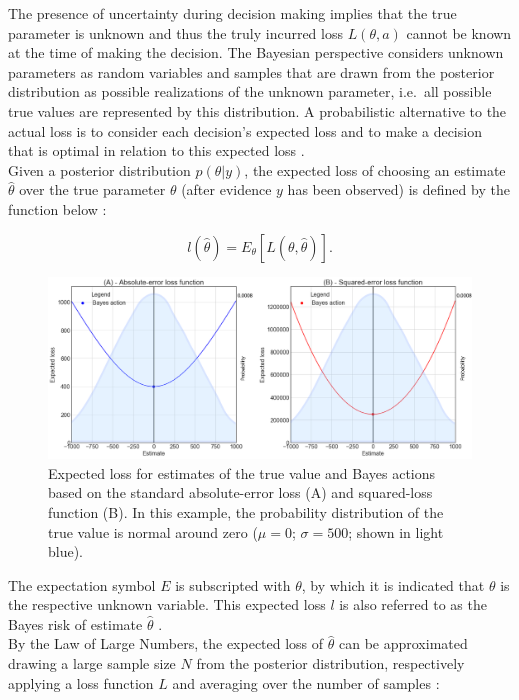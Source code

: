         The presence of uncertainty during decision making implies that the true parameter is unknown and thus the truly incurred loss $L(\theta,a)$ cannot be known at the time of making the decision. The Bayesian perspective considers unknown parameters as random variables and samples that are drawn from the posterior distribution as possible realizations of the unknown parameter, i.e.\ all possible true values are represented by this distribution. A probabilistic alternative to the actual loss is to consider each decision's expected loss and to make a decision that is optimal in relation to this expected loss \citep{berger2013stat, davidson2015}.\\        
        Given a posterior distribution $p(\theta|y)$, the expected loss of choosing an estimate $\hat{\theta}$ over the true parameter $\theta$ (after evidence $y$ has been observed) is defined by the function below \citep{davidson2015}:
        
        \begin{equation}\label{eq:ExpectedLoss}
        l(\hat{\theta}) = E_{\theta}[L(\theta,\hat{\theta})].
        \end{equation}  
        
        \begin{figure}[h]
        	\centering
        	\includegraphics[width=1\textwidth]{Figures/loss_functions2.png}
        	\caption{Expected loss for estimates of the true value and Bayes actions based on the standard absolute-error loss (A) and squared-loss function (B). In this example, the probability distribution of the true value is normal around zero ($\mu = 0$; $\sigma = 500$; shown in light blue).}\label{fig:standard_LF} 
        \end{figure}
        
        The expectation symbol $E$ is subscripted with $\theta$, by which it is indicated that $\theta$ is the respective unknown variable. This expected loss $l$ is also referred to as the Bayes risk of estimate $\hat{\theta}$ \citep{berger2013stat, davidson2015}.\\        
        By the Law of Large Numbers, the expected loss of $\hat{\theta}$ can be approximated drawing a large sample size $N$ from the posterior distribution, respectively applying a loss function $L$ and averaging over the number of samples \citep{davidson2015}:
        
